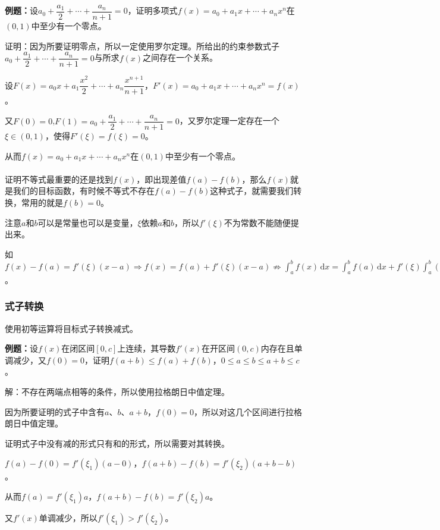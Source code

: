 \textbf{例题：}设$a_0+\dfrac{a_1}{2}+\cdots+\dfrac{a_n}{n+1}=0$，证明多项式$f(x)=a_0+a_1x+\cdots+a_nx^n$在$(0,1)$中至少有一个零点。

证明：因为所要证明零点，所以一定使用罗尔定理。所给出的约束参数式子$a_0+\dfrac{a_1}{2}+\cdots+\dfrac{a_n}{n+1}=0$与所求$f(x)$之间存在一个关系。

设$F(x)=a_0x+a_1\dfrac{x^2}{2}+\cdots+a_n\dfrac{x^{n+1}}{n+1}$，$F'(x)=a_0+a_1x+\cdots+a_nx^n=f(x)$。

又$F(0)=0$,$F(1)=a_0+\dfrac{a_1}{2}+\cdots+\dfrac{a_n}{n+1}=0$，又罗尔定理一定存在一个$\xi\in(0,1)$，使得$F'(\xi)=f(\xi)=0$。

从而$f(x)=a_0+a_1x+\cdots+a_nx^n$在$(0,1)$中至少有一个零点。

\paragraph{}

证明不等式最重要的还是找到$f(x)$，即出现差值$f(a)-f(b)$，那么$f(x)$就是我们的目标函数，有时候不等式不存在$f(a)-f(b)$这种式子，就需要我们转换，常用的就是$f(b)=0$。

注意$a$和$b$可以是常量也可以是变量，$\xi$依赖$a$和$b$，所以$f'(\xi)$不为常数不能随便提出来。

如$f(x)-f(a)=f'(\xi)(x-a)\Rightarrow f(x)=f(a)+f'(\xi)(x-a)\nRightarrow\int_a^bf(x)\,\textrm{d}x=\int_a^bf(a)\,\textrm{d}x+f'(\xi)\int_a^b(x-a)\,\textrm{d}x$。

\subsubsection{式子转换}

使用初等运算将目标式子转换减式。

\textbf{例题：}设$f(x)$在闭区间$[0,c]$上连续，其导数$f'(x)$在开区间$(0,c)$内存在且单调减少，又$f(0)=0$，证明$f(a+b)\leqslant f(a)+f(b)$，$0\leqslant a\leqslant b\leqslant a+b\leqslant c$。

解：不存在两端点相等的条件，所以使用拉格朗日中值定理。

因为所要证明的式子中含有$a$、$b$、$a+b$，$f(0)=0$，所以对这几个区间进行拉格朗日中值定理。

证明式子中没有减的形式只有和的形式，所以需要对其转换。

$f(a)-f(0)=f'(\xi_1)(a-0)$，$f(a+b)-f(b)=f'(\xi_2)(a+b-b)$。

从而$f(a)=f'(\xi_1)a$，$f(a+b)-f(b)=f'(\xi_2)a$。

又$f'(x)$单调减少，所以$f'(\xi_1)>f'(\xi_2)$。


